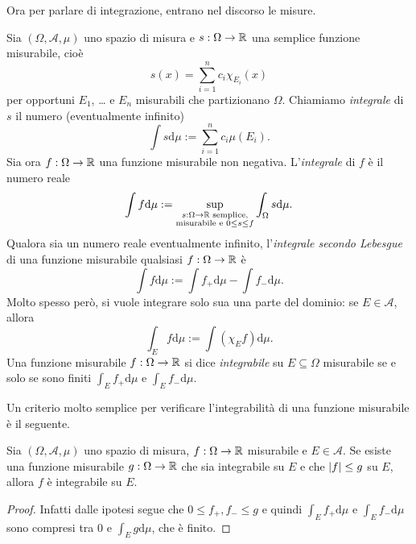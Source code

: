 Ora per parlare di integrazione, entrano nel discorso le misure.

\begin{definizione}
Sia \((\Omega, \mathcal A, \mu)\) uno spazio di misura e \(s : \Omega \to \mathbb R\) una semplice funzione misurabile, cioè
\[s(x) = \sum_{i=1}^n c_i \chi_{E_i}(x)\]
per opportuni \(E_1\), \dots{} e \(E_n\) misurabili che partizionano \(\Omega\). Chiamiamo {\em integrale} di \(s\) il numero (eventualmente infinito)
\[\int s \mathrm d \mu := \sum_{i=1}^n c_i \mu(E_i) .\]
%
Sia ora \(f : \Omega \to \mathbb R\) una funzione misurabile non negativa. L'{\em integrale} di \(f\) è il numero reale
\[\int f \mathrm d \mu := \sup_{\substack{ s : \Omega \to \mathbb R \text{ semplice,} \\ \text{misurabile e } 0 \le s \le f}} \int_\Omega s \mathrm d \mu .\]
Qualora sia un numero reale eventualmente infinito, l'{\em integrale secondo Lebesgue} di una funzione misurabile qualsiasi \(f : \Omega \to \mathbb R\) è
\[\int f \mathrm d \mu := \int f_+ \mathrm d \mu - \int f_- \mathrm d \mu .\]
Molto spesso però, si vuole integrare solo sua una parte del dominio: se \(E \in \mathcal A\), allora
\[\int_E f \mathrm d \mu := \int \left(\chi_E f\right) \mathrm d \mu .\]
Una funzione misurabile \(f : \Omega \to \mathbb R\) si dice {\em integrabile} su \(E \subseteq \Omega\) misurabile se e solo se sono finiti \(\int_E f_+ \mathrm d \mu\) e \(\int_E f_- \mathrm d \mu\).
\end{definizione}

Un criterio molto semplice per verificare l'integrabilità di una funzione misurabile è il seguente.

\begin{proposizione}\label{proposizione:SempliceCriterioIntegrabilità}
Sia \((\Omega, \mathcal A, \mu)\) uno spazio di misura, \(f : \Omega \to \mathbb R\) misurabile e \(E \in \mathcal A\). Se esiste una funzione misurabile \(g : \Omega \to \mathbb R\) che sia integrabile su \(E\) e che \(\left\lvert f\right\rvert \le g\) su \(E\), allora \(f\) è integrabile su \(E\).
\end{proposizione}

\begin{proof}
Infatti dalle ipotesi segue che \(0 \le f_+, f_- \le g\) e quindi \(\int_E f_+ \mathrm d \mu\) e \(\int_E f_- \mathrm d \mu\) sono compresi tra \(0\) e \(\int_E g \mathrm d \mu\), che è finito.
\end{proof}

